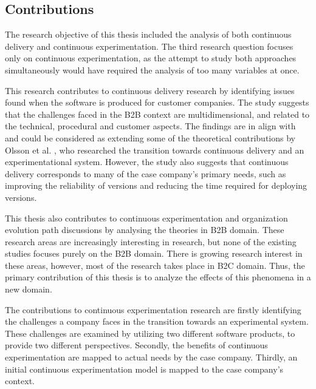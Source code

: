 \documentclass[english]{tktltiki2}
\theoremstyle{definition}
\theoremstyle{remark}
\begin{document}
\subsection{Contributions}
The research objective of this thesis included the analysis of both continuous delivery and continuous experimentation. The third research question focuses only on continuous experimentation, as the attempt to study both approaches simultaneously would have required the analysis of too many variables at once. 

This research contributes to continuous delivery research by identifying issues found when the software is produced for customer companies. The study suggests that the challenges faced in the B2B context are multidimensional, and related to the technical, procedural and customer aspects. The findings are in align with and could be considered as extending some of the theoretical contributions by Olsson et al. \cite{olsson2012climbing}, who researched the transition towards continuous delivery and an experimentational system. However, the study also suggests that continuous delivery corresponds to many of the case company's primary needs, such as improving the reliability of versions and reducing the time required for deploying versions.

This thesis also contributes to continuous experimentation \cite{fagerholm2014building} and organization evolution path \cite{olsson2012climbing} discussions by analysing the theories in B2B domain. These research areas are increasingly interesting in research, but none of the existing studies focuses purely on the B2B domain. There is growing research interest in these areas, however, most of the research takes place in B2C domain. Thus, the primary contribution of this thesis is to analyze the effects of this phenomena in a new domain. 

The contributions to continuous experimentation research are firstly identifying the challenges a company faces in the transition towards an experimental system. These challenges are examined by utilizing two different software products, to provide two different perspectives. Secondly, the benefits of continuous experimentation are mapped to actual needs by the case company. Thirdly, an initial continuous experimentation model \cite{fagerholm2014building} is mapped to the case company's context.
\end{document}
